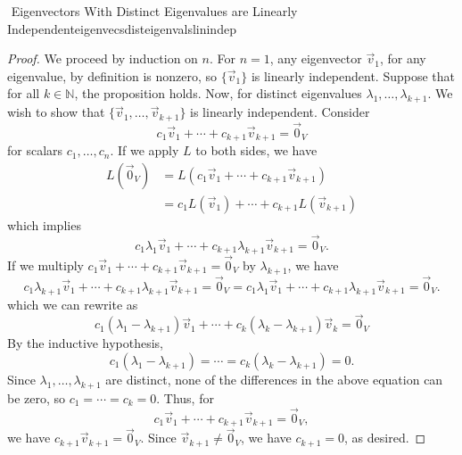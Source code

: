 \begin{theorem}{\Stop\,\,Eigenvectors With Distinct Eigenvalues are Linearly Independent}{eigenvecsdisteigenvalslinindep}
\begin{proof}
                We proceed by induction on \(n\). For \(n=1\), any eigenvector \(\vec{v}_1\), for any eigenvalue, by definition is nonzero, so \(\{\vec{v}_1\}\) is linearly independent. Suppose that for all \(k\in\mathbb{N}\), the proposition holds. Now, for distinct eigenvalues \(\lambda_1,\ldots,\lambda_{k+1}\). We wish to show that \(\{\vec{v}_1,\ldots,\vec{v}_{k+1}\}\) is linearly independent. Consider
                \begin{equation*}
                    c_1\vec{v}_1+\cdots+c_{k+1}\vec{v}_{k+1}=\vec{0}_V
                \end{equation*}
                for scalars \(c_1,\ldots,c_n\). If we apply \(L\) to both sides, we have
                \begin{align*}
                    L(\vec{0}_V)&=L(c_1\vec{v}_1+\cdots+c_{k+1}\vec{v}_{k+1}) \\
                    &=c_1L(\vec{v}_1)+\cdots+c_{k+1}L(\vec{v}_{k+1})
                \end{align*}
                which implies
                \begin{equation*}
                    c_1\lambda_1\vec{v}_1+\cdots+c_{k+1}\lambda_{k+1}\vec{v}_{k+1}=\vec{0}_V.
                \end{equation*}
                If we multiply \(c_1\vec{v}_1+\cdots+c_{k+1}\vec{v}_{k+1}=\vec{0}_V\) by \(\lambda_{k+1}\), we have
                \begin{equation*}
                    c_1\lambda_{k+1}\vec{v}_1+\cdots+c_{k+1}\lambda_{k+1}\vec{v}_{k+1}=\vec{0}_V=c_1\lambda_1\vec{v}_1+\cdots+c_{k+1}\lambda_{k+1}\vec{v}_{k+1}=\vec{0}_V.
                \end{equation*}
                which we can rewrite as
                \begin{equation*}
                    c_1(\lambda_1-\lambda_{k+1})\vec{v}_1+\cdots+c_k(\lambda_k-\lambda_{k+1})\vec{v}_k=\vec{0}_V
                \end{equation*}
                By the inductive hypothesis,
                \begin{equation*}
                    c_1(\lambda_1-\lambda_{k+1})=\cdots=c_k(\lambda_k-\lambda_{k+1})=0.
                \end{equation*}
                Since \(\lambda_1,\ldots,\lambda_{k+1}\) are distinct, none of the differences in the above equation can be zero, so \(c_1=\cdots=c_k=0\). Thus, for
                \begin{equation*}
                    c_1\vec{v}_1+\cdots+c_{k+1}\vec{v}_{k+1}=\vec{0}_V,
                \end{equation*}
                we have \(c_{k+1}\vec{v}_{k+1}=\vec{0}_V\). Since \(\vec{v}_{k+1}\neq\vec{0}_V\), we have \(c_{k+1}=0\), as desired.
            \end{proof}
            
        \end{theorem}
